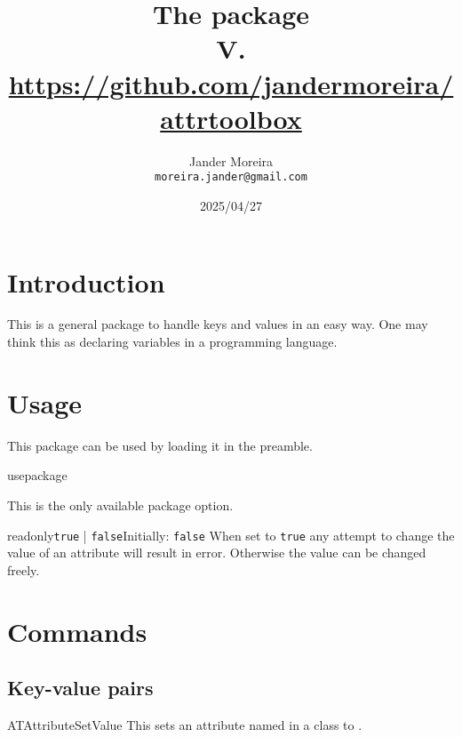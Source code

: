 \documentclass[a4paper, 11pt]{article}
\title{
    The \PackageName{attrtoolbox} package\\
    \small V.\ATVersion\\
    \normalsize\url{https://github.com/jandermoreira/attrtoolbox}
}
\author{Jander Moreira\\\small\texttt{moreira.jander@gmail.com}}
\date{2025/04/27}
\begin{document}
\maketitle
\PDPrintChanges



\section{Introduction}
This is a general package to handle keys and values in an easy way. One may think this as declaring variables in a programming language.


\section{Usage}
This package can be used by loading it in the preamble.

\begin{Macro*}{usepackage}{}{}
\end{Macro*}

This is the only available package option.

\begin{Optiondef}{readonly}{\texttt{true} | \texttt{false}}{Initially: \texttt{false}}
    When set to \texttt{true} any attempt to change the value of an attribute will result in error. Otherwise the value can be changed freely.
\end{Optiondef}

\begin{PDListing}
    \usepackage[readonly]{attrtoolbox}
\end{PDListing}


\section{Commands}

\subsection{Key-value pairs}

\begin{Macrodef}{ATAttributeSetValue}{}{}
    This sets an attribute named  in a class  to .
\end{Macrodef}
\end{document}
